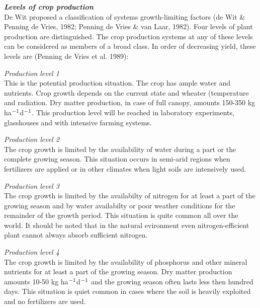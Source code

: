 \documentclass[11pt]{article}
\begin{document}
\bigskip
{\bf {\it Levels of crop production\/}}\\
De Wit proposed a classification of systems growth-limiting factors (de Wit \&
Penning de Vries, 1982; Penning de Vries \& van Laar, 1982). Four levels of plant
production are distinguished. The crop production systems at any of these levels can
be considered as members of a broad class. In order of decreasing yield, these levels
are (Penning de Vries et al. 1989):

{\it Production level 1\/}\\
This is the potential production situation. The crop has ample water and nutrients.
Crop growth depends on the current state and wheater (temperature and radiation.
Dry matter production, in case of full canopy, amounts 150-350 kg ha$^{{\rm -1}}$d$^{{\rm -1}}$. This
production level will be reached in laboratory experiments, glasshouses and with
intensive farming systems.

{\it Production level 2\/}\\
The crop growth is limited by the availability of water during a part or the complete
growing season. This situation occurs in semi-arid regions when fertilizers are applied
or in other climates when light soils are intensively used.

{\it Production level 3\/}\\
The crop growth is limited by the availabilty of nitrogen for at least a part of the
growing season and by water availabilty or poor weather conditions for the remainder
of the growth period. This situation is quite common all over the world. It should be
noted that in the natural evironment even nitrogen-efficient plant cannot always
absorb sufficient nitrogen.

{\it Production level 4\/}\\
The crop growth is limited by the availability of phosphorus and other mineral
nutrients for at least a part of the growing season. Dry matter production amounts
10-50 kg ha$^{{\rm -1}}$d$^{{\rm -1}}$ and the growing season often lasts less then hundred days. This
situation is quiet common in cases where the soil is heavily exploited and no fertiliz\-ers are used. 
\end{document}

